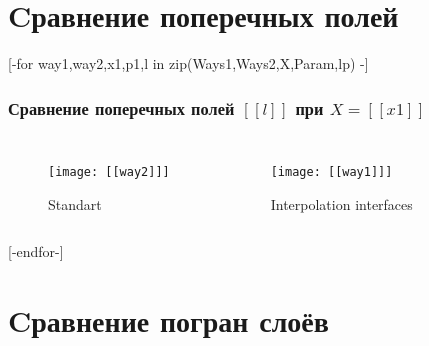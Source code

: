 \documentclass[c, aspectratio = 169]{beamer}
\begin{document}
        \section{Cравнение поперечных полей} 
    [-for way1,way2,x1,p1,l in zip(Ways1,Ways2,X,Param,lp) -]
    \begin{frame}
    \frametitle{Сравнение поперечных полей $[[l]]$ при $X=[[x1]]$}
    \begin{columns}[c] 
        
        \vspace{-0.4cm}
        
            \begin{figure}
                \texttt{[image: [[way2]]]}
                \caption{Standart}    
            \end{figure}   
    
     
        \vspace{-0.4cm}
        
            \begin{figure}
                \texttt{[image: [[way1]]]}
                \caption{Interpolation interfaces}   
            \end{figure}  
    \end{columns}
    \end{frame}
    [-endfor-]                
    
\section{Cравнение погран слоёв} 
\end{document}
